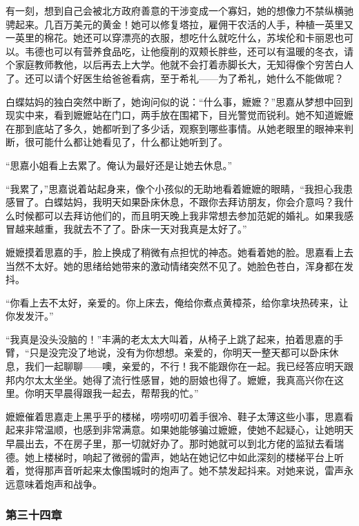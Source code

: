 \par 有一刻，想到自己会被北方政府善意的干涉变成一个寡妇，她的想像力不禁纵横驰骋起来。几百万美元的黄金！她可以修复塔拉，雇佣干农活的人手，种植一英里又一英里的棉花。她还可以穿漂亮的衣服，想吃什么就吃什么，苏埃伦和卡丽恩也可以。韦德也可以有营养食品吃，让他瘦削的双颊长胖些，还可以有温暖的冬衣，请个家庭教师教他，以后再去上大学。他就不会打着赤脚长大，无知得像个穷苦白人了。还可以请个好医生给爸爸看病，至于希礼——为了希礼，她什么不能做呢？
\par 白蝶姑妈的独白突然中断了，她询问似的说：“什么事，嬷嬷？”思嘉从梦想中回到现实中来，看到嬷嬷站在门口，两手放在围裙下，目光警觉而锐利。她不知道嬷嬷在那到底站了多久，她都听到了多少话，观察到哪些事情。从她老眼里的眼神来判断，很可能什么都让她看见了，什么都让她听到了。
\par “思嘉小姐看上去累了。俺认为最好还是让她去休息。”
\par “我累了，”思嘉说着站起身来，像个小孩似的无助地看着嬷嬷的眼睛，“我担心我患感冒了。白蝶姑妈，我明天如果卧床休息，不跟你去拜访朋友，你会介意吗？我什么时候都可以去拜访他们的，而且明天晚上我非常想去参加范妮的婚礼。如果我感冒越来越重，我就去不了了。卧床一天对我真是太好了。”
\par 嬷嬷摸着思嘉的手，脸上换成了稍微有点担忧的神态。她看着她的脸。思嘉看上去当然不太好。她的思绪给她带来的激动情绪突然不见了。她脸色苍白，浑身都在发抖。
\par “你看上去不太好，亲爱的。你上床去，俺给你煮点黄樟茶，给你拿块热砖来，让你发发汗。”
\par “我真是没头没脑的！”丰满的老太太大叫着，从椅子上跳了起来，拍着思嘉的手臂，“只是没完没了地说，没有为你想想。亲爱的，你明天一整天都可以卧床休息，我们一起聊聊——噢，亲爱的，不行！我不能跟你在一起。我已经答应明天跟邦内尔太太坐坐。她得了流行性感冒，她的厨娘也得了。嬷嬷，我真高兴你在这里。你明天早晨得跟我一起去，帮帮我的忙。”
\par 嬷嬷催着思嘉走上黑乎乎的楼梯，唠唠叨叨着手很冷、鞋子太薄这些小事，思嘉看起来非常温顺，也感到非常满意。如果她能够骗过嬷嬷，使她不起疑心，让她明天早晨出去，不在房子里，那一切就好办了。那时她就可以到北方佬的监狱去看瑞德。她上楼梯时，响起了微弱的雷声，她站在她记忆中如此深刻的楼梯平台上听着，觉得那声音听起来太像围城时的炮声了。她不禁发起抖来。对她来说，雷声永远意味着炮声和战争。

\subsubsection{第三十四章}

